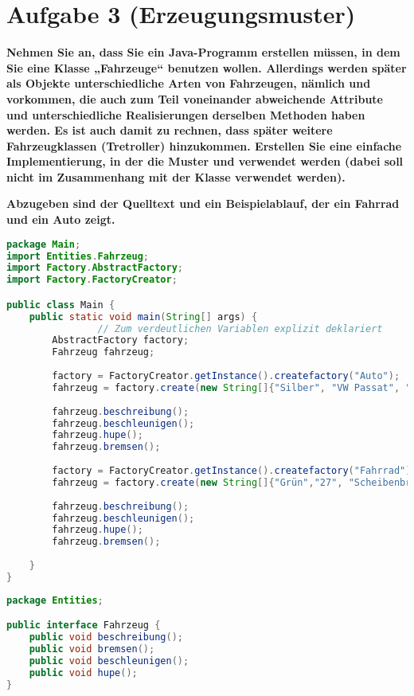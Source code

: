 \section{Aufgabe 3 (Erzeugungsmuster)}

\textbf{Nehmen Sie an, dass Sie ein Java-Programm erstellen müssen, in dem Sie eine Klasse
„Fahrzeuge“ benutzen wollen. Allerdings werden später als Objekte unterschiedliche Arten
von Fahrzeugen, nämlich  und  vorkommen, die auch zum
Teil voneinander abweichende Attribute und unterschiedliche Realisierungen derselben
Methoden haben werden. Es ist auch damit zu rechnen, dass später weitere
Fahrzeugklassen (\zB Tretroller) hinzukommen. Erstellen Sie eine einfache
Implementierung, in der die Muster  und 
verwendet werden (dabei soll  nicht im Zusammenhang mit der
Klasse  verwendet werden).}

\textbf{Abzugeben sind der Quelltext und ein Beispielablauf, der ein Fahrrad
und ein Auto zeigt.}

\begin{lstlisting}[language=java, style=java, caption={Main.java},
label={lst:lst1}]
package Main;
import Entities.Fahrzeug;
import Factory.AbstractFactory;
import Factory.FactoryCreator;

public class Main {
	public static void main(String[] args) {
				// Zum verdeutlichen Variablen explizit deklariert
		AbstractFactory factory;
		Fahrzeug fahrzeug;
		
		factory = FactoryCreator.getInstance().createfactory("Auto");
		fahrzeug = factory.create(new String[]{"Silber", "VW Passat", "106"});
		
		fahrzeug.beschreibung();
		fahrzeug.beschleunigen();
		fahrzeug.hupe();
		fahrzeug.bremsen();
		
		factory = FactoryCreator.getInstance().createfactory("Fahrrad");
		fahrzeug = factory.create(new String[]{"Grün","27", "Scheibenbremsen"});
		
		fahrzeug.beschreibung();
		fahrzeug.beschleunigen();
		fahrzeug.hupe();
		fahrzeug.bremsen();
		
	}
}
\end{lstlisting}


\begin{lstlisting}[language=java, style=java, caption={Fahrzeug.java},
label={lst:lst2}]
package Entities;

public interface Fahrzeug {
	public void beschreibung();
	public void bremsen();
	public void beschleunigen();
	public void hupe();
}
\end{lstlisting}


